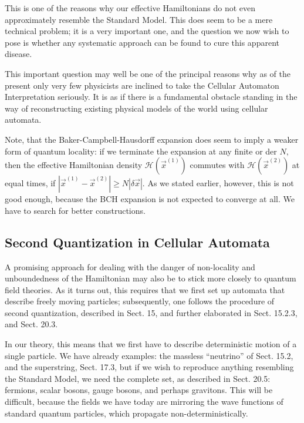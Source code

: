 \documentclass[main.tex]{subfiles}
\begin{document}
This is one of the reasons why our effective Hamiltonians do not even approximately resemble the Standard Model. This does seem to be a mere technical problem; it is a very important one, and the question we now wish to pose is whether any systematic approach can be found to cure this apparent disease.

This important question may well be one of the principal reasons why as of the present only very few physicists are inclined to take the Cellular Automaton Interpretation seriously. It is as if there is a fundamental obstacle standing in the way of reconstructing existing physical models of the world using cellular automata.

Note, that the Baker-Campbell-Hausdorff expansion does seem to imply a weaker form of quantum locality: if we terminate the expansion at any finite or der $N,$ then the effective Hamiltonian density $\mathcal{H}\left(\vec{x}^{(1)}\right)$ commutes with $\mathcal{H}\left(\vec{x}^{(2)}\right)$ at equal times, if $\left|\vec{x}^{(1)}-\vec{x}^{(2)}\right| \geq N|\delta \vec{x}| .$ As we stated earlier, however, this is not good enough, because the BCH expansion is not expected to converge at all. We have to search for better constructions.




\subsection{Second Quantization in Cellular Automata}\label{ch22.1}

A promising approach for dealing with the danger of non-locality and unboundedness of the Hamiltonian may also be to stick more closely to quantum field theories. As it turns out, this requires that we first set up automata that describe freely moving particles; subsequently, one follows the procedure of second quantization, described
in Sect. 15, and further elaborated in Sect. 15.2.3, and Sect. 20.3.

In our theory, this means that we first have to describe deterministic motion of a single particle. We have already examples: the massless “neutrino” of Sect. 15.2, and the superstring, Sect. 17.3, but if we wish to reproduce anything resembling the Standard Model, we need the complete set, as described in Sect. 20.5: fermions, scalar bosons, gauge bosons, and perhaps gravitons. This will be difficult, because the fields we have today are mirroring the wave functions of standard quantum particles, which propagate non-deterministically.
\end{document}
